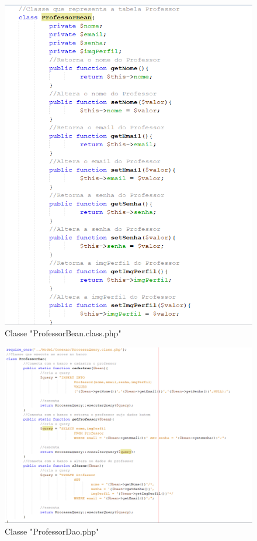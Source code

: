 \begin{figure}
	\centering
	\includegraphics[width=0.9\linewidth]{cadastroView6}
	\caption{Classe "ProfessorBean.class.php"}
	\label{fig:cadastroview6}
\end{figure}

\begin{figure}
	\centering
	\includegraphics[width=0.9\linewidth]{cadastroView7}
	\caption{Classe "ProfessorDao.php"}
	\label{fig:cadastroview7}
\end{figure}




